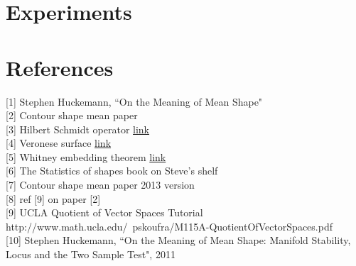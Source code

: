 \documentclass[12pt]{article}
\theoremstyle{definition}
\theoremstyle{remark}
\numberwithin{equation}{section}
\begin{document}
\section{Experiments}
\section{References}
[1] Stephen Huckemann, ``On the Meaning of Mean Shape" \\[0.2cm]
[2] Contour shape mean paper\\[0.2cm]
[3] Hilbert Schmidt operator \href{http://en.wikipedia.org/wiki/Hilbert\%E2\%80\%93Schmidt_operator}{link}\\[0.2cm]
[4] Veronese surface \href{http://en.wikipedia.org/wiki/Veronese_surface}{link}\\[0.2cm]
[5] Whitney embedding theorem \href{http://en.wikipedia.org/wiki/Whitney_embedding_theorem}{link}\\[0.2cm]
[6] The Statistics of shapes book on Steve's shelf\\[0.2cm]
[7] Contour shape mean paper 2013 version \\[0.2cm]
[8] ref [9] on paper [2] \\[0.2cm]
[9] UCLA Quotient of Vector Spaces Tutorial  \\[0.2cm]
http://www.math.ucla.edu/~pskoufra/M115A-QuotientOfVectorSpaces.pdf\\[0.2cm]
[10] Stephen Huckemann, ``On the Meaning of Mean Shape: Manifold Stability, Locus and the Two Sample Test", 2011 \\ 
\end{document}
